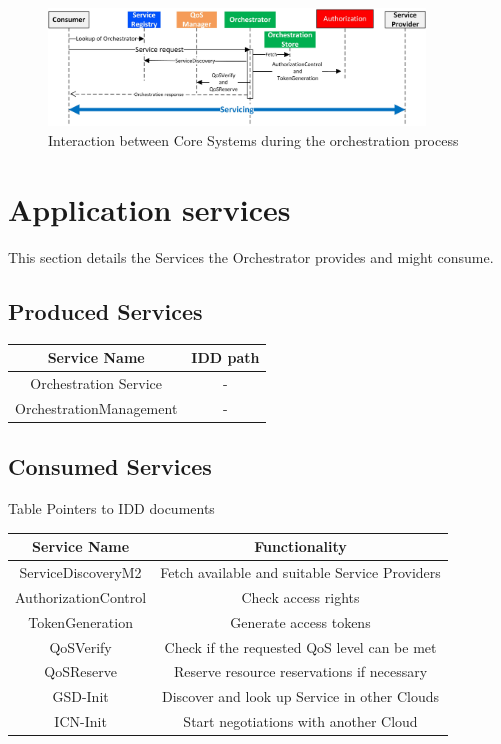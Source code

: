 \documentclass[a4paper]{arrowhead}
\begin{document}
\begin{figure}[h!]
	\centering
	\includegraphics[width=10cm]{fig/intra-orch-proc.jpg}
	\caption{Interaction between Core Systems during the orchestration process}
	\label{fig:OrchProc2}
\end{figure}

\section{Application services}
This section details the Services the Orchestrator provides and might consume.

\subsection[Produced Services]{Produced Services}

\begin{tabular}{|c|c|}
	\hline 
	Service Name & IDD path \\ 
	\hline 
	Orchestration Service & - \\ 
	\hline 
	OrchestrationManagement & - \\ 
	\hline 
\end{tabular} 

\subsection[Consumed Services]{Consumed Services}
Table  Pointers to IDD documents

\begin{tabular}{|c|c|}
	\hline 
	Service Name & Functionality \\ 
	\hline 
	ServiceDiscoveryM2 & Fetch available and suitable Service Providers \\ 
	\hline
	AuthorizationControl & Check access rights \\ 
	\hline 
	TokenGeneration & Generate access tokens \\ 
	\hline
	QoSVerify & Check if the requested QoS level can be met \\ 
	\hline
	QoSReserve & Reserve resource reservations if necessary \\ 
	\hline
	GSD-Init & Discover and look up Service in other Clouds \\ 
	\hline
	ICN-Init& Start negotiations with another Cloud \\ 
	\hline
	
\end{tabular} 
\end{document}
